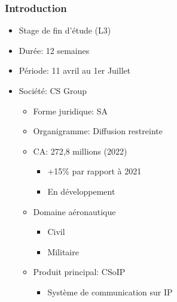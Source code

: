 \begin{frame}
    \frametitle{Introduction}
    \begin{itemize}
        \item Stage de fin d'étude (L3)
        \item Durée: 12 semaines
        \item Période: 11 avril au 1er Juillet
        \item Société: CS Group
            \begin{itemize}
                \item Forme juridique: SA
                \item Organigramme: Diffusion restreinte
                \item CA: 272,8 millions (2022)
                    \begin{itemize}
                        \item +15\% par rapport à 2021
                        \item En développement
                    \end{itemize}
                \item Domaine aéronautique
                    \begin{itemize}
                        \item Civil
                        \item Militaire
                    \end{itemize}
                \item Produit principal: CSoIP
                    \begin{itemize}
                        \item Système de communication sur IP
                    \end{itemize}
            \end{itemize}
    \end{itemize}
\end{frame}